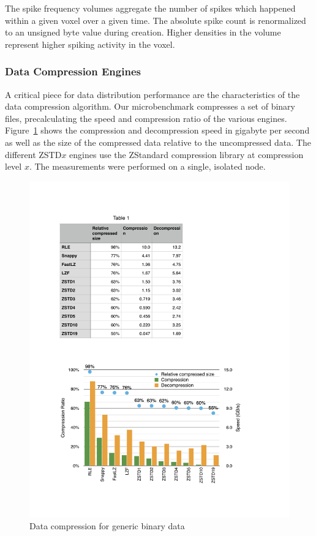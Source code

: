 \documentclass[10pt,journal,compsoc]{IEEEtran}
\newcommand{\fig}[1]{Figure~\ref{#1}}
\begin{document}
The spike frequency volumes aggregate the number of spikes which happened within
a given voxel over a given time. The absolute spike count is renormalized to an
unsigned byte value during creation. Higher densities in the volume represent
higher spiking activity in the voxel.

\subsubsection{Data Compression Engines}

A critical piece for data distribution performance are the characteristics of
the data compression algorithm. Our microbenchmark compresses a set of binary
files, precalculating the speed and compression ratio of the various engines.
\fig{fCompressor} shows the compression and decompression speed in gigabyte per
second as well as the size of the compressed data relative to the uncompressed
data. The different ZSTD$x$ engines use the ZStandard compression library at
compression level $x$. The measurements were performed on a single, isolated
node.

\begin{figure}[ht]\center
  \includegraphics[width=\columnwidth]{images/compressor}
  \caption{\label{fCompressor}Data compression for generic binary data}
\end{figure}
\end{document}
